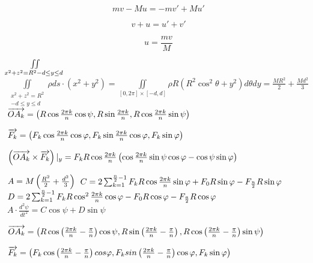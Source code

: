 \documentclass[withoutpreface,bwprint]{cumcmthesis} %
\begin{document}
\begin{equation}
mv-Mu=-m{v}'+M{u}'
\end{equation}

\begin{equation}
v+u={u}'+{v}'
\end{equation}

\begin{equation}
u=\frac{mv}{M}
\end{equation}


$\iint \limits_{ x^{2}+z^{2}=R^{2} \\ -d\leq y\leq d }$\\

$\iint \limits_{ \substack{x^{2}+z^{2}=R^{2} \\ -d\leq y\leq d }} \rho {d}s\cdot\left ( x^2+y^2 \right )
=\iint \limits_{\left [ 0,2\pi \right ] \times\left [ -d,d \right ] } \rho R\left ( R^2\cos^2\theta +y^2 \right ){d}\theta {d}y
=\frac{MR^2}{2}+\frac{Md^2}{3}  $
\\
$
\overrightarrow{OA_k}=\left ( R\cos\frac{2\pi k}{n}\cos \psi ,R\sin\frac{2\pi k}{n},R \cos\frac{2\pi k}{n}\sin\psi \right ) \\
$

$\overrightarrow{F_k}=\left ( F_k\cos\frac{2\pi k}{n}\cos\varphi ,F_k\sin\frac{2\pi k}{n}\cos\varphi ,F_k\sin\varphi  \right ) \\$

$\left ( \overrightarrow{OA_k} \times \overrightarrow{F_k}\right )|_y=F_kR\cos\frac{2\pi k}{n}\left ( \cos\frac{2\pi k}{n}\sin\psi\cos\varphi -\cos\psi\sin\varphi  \right ) \\$

$A=M\left ( \frac{R^2}{2}+\frac{d^2}{3} \right ) \\$
$C=2\sum_{k=1}^{\frac{n}{2}-1}F_kR\cos\frac{2\pi k}{n}\sin\varphi + F_0 R\sin\varphi- F_\frac{n}{2} R\sin\varphi
 \\ $
$D=2\sum_{k=1}^{\frac{n}{2}-1}F_kR\cos^2\frac{2\pi k}{n}\cos\varphi-F_0R\cos\varphi-F_\frac{a}{2}R\cos\varphi 
\\$
$A\cdot \frac{d^{2}\psi }{dt^{2} }=C\cos\psi+D\sin \psi
$



$\overrightarrow{OA_k}=\left ( R\cos\left( \frac{2\pi k}{n}-\frac{\pi}{n}\right )\cos \psi ,R\sin\left( \frac{2\pi k}{n}-\frac{\pi}{n}\right ),R\cos\left( \frac{2\pi k}{n}-\frac{\pi}{n}\right )\sin \psi \right ) \\$

$\overrightarrow{F_k}=\left ( F_k\cos\left( \frac{2\pi k}{n}-\frac{\pi}{n}\right )\\cos\varphi ,F_ksin\left( \frac{2\pi k}{n}-\frac{\pi}{n}\right )\cos\varphi ,F_k\sin\varphi  \right ) \\$
\end{document}
